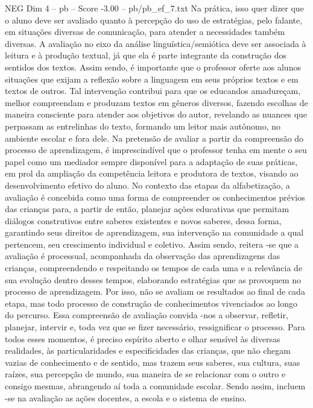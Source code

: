 \begin{textsample}{NEG Dim 4 – pb – Score -3.00 – pb/pb\_ef\_7.txt}
Na prática, isso quer dizer que o aluno deve ser avaliado quanto à percepção do uso de estratégias, pelo falante, em situações diversas de comunicação, para atender a necessidades também diversas.
A avaliação no eixo da análise linguística/semiótica deve ser associada à leitura e à produção textual, já que ela é parte integrante da construção dos sentidos dos textos.
Assim sendo, é importante que o professor oferte aos alunos situações que exijam a reflexão sobre a linguagem em seus próprios textos e em textos de outros.
Tal intervenção contribui para que os educandos amadureçam, melhor compreendam e produzam textos em gêneros diversos, fazendo escolhas de maneira consciente para atender aos objetivos do autor, revelando as nuances que perpassam as entrelinhas do texto, formando um leitor mais autônomo, no ambiente escolar e fora dele.
Na pretensão de avaliar a partir da compreensão do processo de aprendizagem, é imprescindível que o professor tenha em mente o seu papel como um mediador sempre disponível para a adaptação de suas práticas, em prol da ampliação da competência leitora e produtora de textos, visando ao desenvolvimento efetivo do aluno.
No contexto das etapas da alfabetização, a avaliação é concebida como uma forma de compreender os conhecimentos prévios das crianças para, a partir de então, planejar ações educativas que permitam diálogos construtivos entre saberes existentes e novos saberes, dessa forma, garantindo seus direitos de aprendizagem, sua intervenção na comunidade a qual pertencem, seu crescimento individual e coletivo.
Assim sendo, reitera -se que a avaliação é processual, acompanhada da observação das aprendizagens das crianças, compreendendo e respeitando os tempos de cada uma e a relevância de sua evolução dentro desses tempos, elaborando estratégias que as provoquem no processo de aprendizagem.
Por isso, não se avaliam os resultados ao final de cada etapa, mas todo processo de construção de conhecimentos vivenciados ao longo do percurso.
Essa compreensão de avaliação convida -nos a observar, refletir, planejar, intervir e, toda vez que se fizer necessário, ressignificar o processo.
Para todos esses momentos, é preciso espírito aberto e olhar sensível às diversas realidades, às particularidades e especificidades das crianças, que não chegam vazias de conhecimento e de sentido, mas trazem seus saberes, sua cultura, suas raízes, sua percepção de mundo, sua maneira de se relacionar com o outro e consigo mesmas, abrangendo aí toda a comunidade escolar.
Sendo assim, incluem -se na avaliação as ações docentes, a escola e o sistema de ensino.

\end{textsample}
